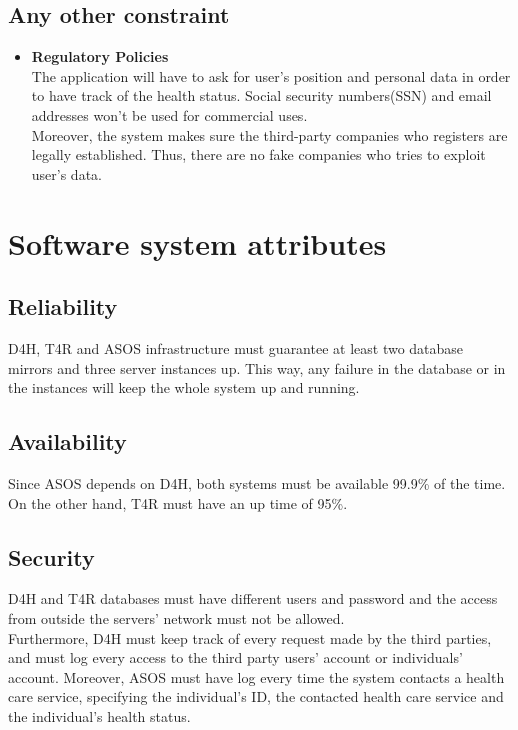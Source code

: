 \documentclass[a4paper, hidelinks, 12pt]{report}
\begin{document}
	\subsection{Any other constraint}
	\begin{itemize}
		\item{} \textbf{Regulatory Policies}\\
		The application will have to ask for user's position and personal data in order to have track of the health status. Social security numbers(SSN) and email addresses won't be used for commercial uses.\\
		
		Moreover, the system makes sure the third-party companies who registers are legally established. Thus, there are no fake companies who tries to exploit user's data.
	\end{itemize}
	
	\section{Software system attributes}	
	\subsection{Reliability}
	D4H, T4R and ASOS infrastructure must guarantee at least two database mirrors and three server instances up. This way, any failure in the database or in the instances will keep the whole system up and running.
	
	\subsection{Availability}
	Since ASOS depends on D4H, both systems must be available 99.9\% of the time. On the other hand, T4R must have an up time of 95\%.
	
	\subsection{Security}
	D4H and T4R databases must have different users and password and the access from outside the servers' network must not be allowed.\\
	
	Furthermore, D4H must keep track of every request made by the third parties, and must log every access to the third party users' account or individuals' account. Moreover, ASOS must have log every time the system contacts a health care service, specifying the individual's ID, the contacted health care service and the individual's health status. \\
	
\end{document}
